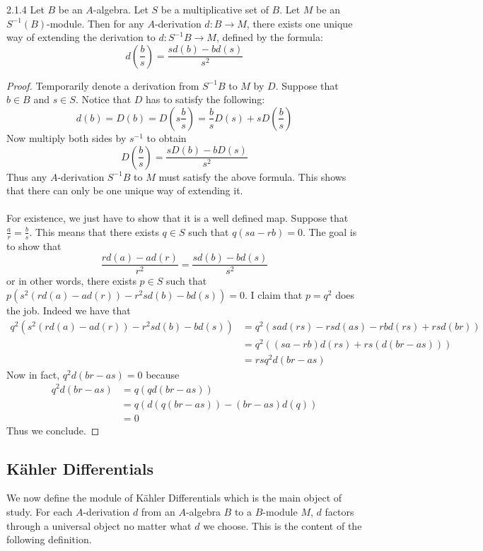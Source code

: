 \documentclass[a4paper]{article}
\begin{document}
\begin{prp}{}{2.1.4} Let $B$ be an $A$-algebra. Let $S$ be a multiplicative set of $B$. Let $M$ be an $S^{-1}(B)$-module. Then for any $A$-derivation $d:B\to M$, there exists one unique way of extending the derivation to $d:S^{-1}B\to M$, defined by the formula: $$d\left(\frac{b}{s}\right)=\frac{sd(b)-bd(s)}{s^2}$$ \tcbline
\begin{proof}
Temporarily denote a derivation from $S^{-1}B$ to $M$ by $D$. Suppose that $b\in B$ and $s\in S$. Notice that $D$ has to satisfy the following: $$d(b)=D(b)=D\left(s\frac{b}{s}\right)=\frac{b}{s}D(s)+sD\left(\frac{b}{s}\right)$$ Now multiply both sides by $s^{-1}$ to obtain $$D\left(\frac{b}{s}\right)=\frac{sD(b)-bD(s)}{s^2}$$ Thus any $A$-derivation $S^{-1}B$ to $M$ must satisfy the above formula. This shows that there can only be one unique way of extending it. \\~\\

For existence, we just have to show that it is a well defined map. Suppose that $\frac{a}{r}=\frac{b}{s}$. This means that there exists $q\in S$ such that $q(sa-rb)=0$. The goal is to show that $$\frac{rd(a)-ad(r)}{r^2}=\frac{sd(b)-bd(s)}{s^2}$$ or in other words, there exists $p\in S$ such that $p\left(s^2(rd(a)-ad(r))-r^2sd(b)-bd(s)\right)=0$. I claim that $p=q^2$ does the job. Indeed we have that
\begin{align*}
q^2\left(s^2(rd(a)-ad(r))-r^2sd(b)-bd(s)\right)&=q^2(sad(rs)-rsd(as)-rbd(rs)+rsd(br))\\
&=q^2((sa-rb)d(rs)+rs(d(br-as)))\\
&=rsq^2d(br-as)
\end{align*}
Now in fact, $q^2d(br-as)=0$ because 
\begin{align*}
q^2d(br-as)&=q(qd(br-as))\\
&=q(d(q(br-as))-(br-as)d(q))\\
&=0
\end{align*}
Thus we conclude. 
\end{proof}
\end{prp}

\subsection{Kähler Differentials}
We now define the module of Kähler Differentials which is the main object of study. For each $A$-derivation $d$ from an $A$-algebra $B$ to a $B$-module $M$, $d$ factors through a universal object no matter what $d$ we choose. This is the content of the following definition. 
\end{document}
